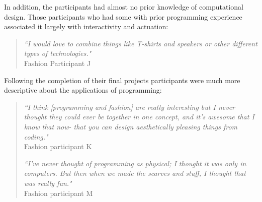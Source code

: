 In addition, the participants had almost no prior knowledge of computational design. Those participants who had some with prior programming experience associated it largely with interactivity and actuation:
\begin{quotation}
\textit{``I would love to combine things like T-shirts and speakers or other different types of technologies."}
\\Fashion Participant J
\end{quotation}

Following the completion of their final projects participants were much more descriptive about the applications of programming:

\begin{quotation}
\textit{``I think [programming and fashion] are really interesting but I never thought they could ever be together in one concept, and it's awesome that I know that now- that you can design aesthetically pleasing things from coding."}
\\Fashion participant K


\textit{``I've never thought of programming as physical; I thought it was only in computers. But then when we made the scarves and stuff, I thought that was really fun."}
\\Fashion participant M
\end{quotation}

